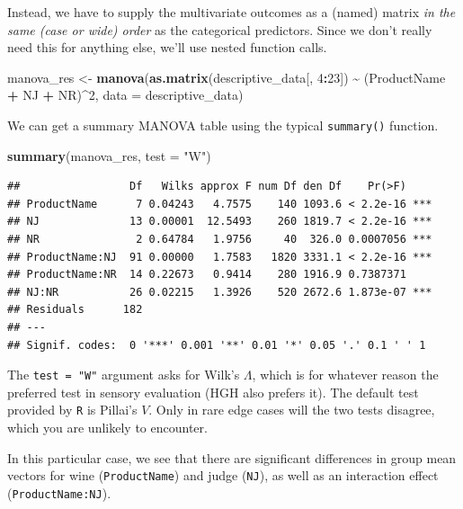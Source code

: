 \documentclass[
]{book}
\newenvironment{Shaded}{\begin{snugshade}}{\end{snugshade}}
\newcommand{\AttributeTok}[1]{\textcolor[rgb]{0.13,0.29,0.53}{#1}}
\newcommand{\DecValTok}[1]{\textcolor[rgb]{0.00,0.00,0.81}{#1}}
\newcommand{\FunctionTok}[1]{\textcolor[rgb]{0.13,0.29,0.53}{\textbf{#1}}}
\newcommand{\NormalTok}[1]{#1}
\newcommand{\OtherTok}[1]{\textcolor[rgb]{0.56,0.35,0.01}{#1}}
\newcommand{\SpecialCharTok}[1]{\textcolor[rgb]{0.81,0.36,0.00}{\textbf{#1}}}
\newcommand{\StringTok}[1]{\textcolor[rgb]{0.31,0.60,0.02}{#1}}
\begin{document}
Instead, we have to supply the multivariate outcomes as a (named) matrix \emph{in the same (case or wide) order} as the categorical predictors. Since we don't really need this for anything else, we'll use nested function calls.

\begin{Shaded}
\begin{Highlighting}[]
\NormalTok{manova\_res }\OtherTok{\textless{}{-}} 
  \FunctionTok{manova}\NormalTok{(}\FunctionTok{as.matrix}\NormalTok{(descriptive\_data[, }\DecValTok{4}\SpecialCharTok{:}\DecValTok{23}\NormalTok{]) }\SpecialCharTok{\textasciitilde{}}\NormalTok{ (ProductName }\SpecialCharTok{+}\NormalTok{ NJ }\SpecialCharTok{+}\NormalTok{ NR)}\SpecialCharTok{\^{}}\DecValTok{2}\NormalTok{, }
         \AttributeTok{data =}\NormalTok{ descriptive\_data)}
\end{Highlighting}
\end{Shaded}

We can get a summary MANOVA table using the typical \texttt{summary()} function.

\begin{Shaded}
\begin{Highlighting}[]
\FunctionTok{summary}\NormalTok{(manova\_res, }\AttributeTok{test =} \StringTok{"W"}\NormalTok{)}
\end{Highlighting}
\end{Shaded}

\begin{verbatim}
##                 Df   Wilks approx F num Df den Df    Pr(>F)    
## ProductName      7 0.04243   4.7575    140 1093.6 < 2.2e-16 ***
## NJ              13 0.00001  12.5493    260 1819.7 < 2.2e-16 ***
## NR               2 0.64784   1.9756     40  326.0 0.0007056 ***
## ProductName:NJ  91 0.00000   1.7583   1820 3331.1 < 2.2e-16 ***
## ProductName:NR  14 0.22673   0.9414    280 1916.9 0.7387371    
## NJ:NR           26 0.02215   1.3926    520 2672.6 1.873e-07 ***
## Residuals      182                                             
## ---
## Signif. codes:  0 '***' 0.001 '**' 0.01 '*' 0.05 '.' 0.1 ' ' 1
\end{verbatim}

The \texttt{test\ =\ "W"} argument asks for Wilk's \(\Lambda\), which is for whatever reason the preferred test in sensory evaluation (HGH also prefers it). The default test provided by \texttt{R} is Pillai's \(V\). Only in rare edge cases will the two tests disagree, which you are unlikely to encounter.

In this particular case, we see that there are significant differences in group mean vectors for wine (\texttt{ProductName}) and judge (\texttt{NJ}), as well as an interaction effect (\texttt{ProductName:NJ}).
\end{document}
